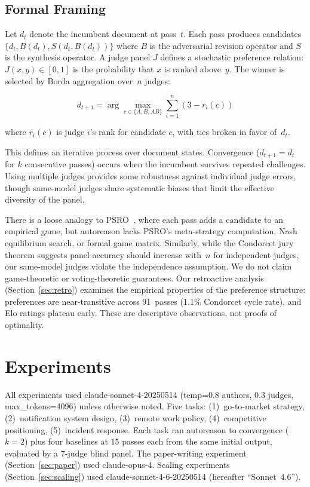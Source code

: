 \documentclass[11pt]{article}
\begin{document}
\subsection{Formal Framing}

Let $d_t$ denote the incumbent document at pass~$t$. Each pass produces candidates $\{d_t, B(d_t), S(d_t, B(d_t))\}$ where $B$ is the adversarial revision operator and $S$ is the synthesis operator. A judge panel $J$ defines a stochastic preference relation: $J(x, y) \in [0,1]$ is the probability that $x$ is ranked above~$y$. The winner is selected by Borda aggregation over~$n$ judges:

$$d_{t+1} = \arg\max_{c \in \{A, B, AB\}} \sum_{i=1}^{n} (3 - r_i(c))$$

where $r_i(c)$ is judge $i$'s rank for candidate $c$, with ties broken in favor of~$d_t$.

This defines an iterative process over document states. Convergence ($d_{t+1} = d_t$ for $k$ consecutive passes) occurs when the incumbent survives repeated challenges. Using multiple judges provides some robustness against individual judge errors, though same-model judges share systematic biases that limit the effective diversity of the panel.

There is a loose analogy to PSRO~\cite{psro}, where each pass adds a candidate to an empirical game, but autoreason lacks PSRO's meta-strategy computation, Nash equilibrium search, or formal game matrix. Similarly, while the Condorcet jury theorem suggests panel accuracy should increase with~$n$ for independent judges, our same-model judges violate the independence assumption. We do not claim game-theoretic or voting-theoretic guarantees. Our retroactive analysis (Section~\ref{sec:retro}) examines the empirical properties of the preference structure: preferences are near-transitive across 91~passes (1.1\% Condorcet cycle rate), and Elo ratings plateau early. These are descriptive observations, not proofs of optimality.

\section{Experiments}

All experiments used claude-sonnet-4-20250514 (temp=0.8 authors, 0.3 judges, max\_tokens=4096) unless otherwise noted. Five tasks: (1)~go-to-market strategy, (2)~notification system design, (3)~remote work policy, (4)~competitive positioning, (5)~incident response. Each task ran autoreason to convergence ($k{=}2$) plus four baselines at 15 passes each from the same initial output, evaluated by a 7-judge blind panel. The paper-writing experiment (Section~\ref{sec:paper}) used claude-opus-4. Scaling experiments (Section~\ref{sec:scaling}) used claude-sonnet-4-6-20250514 (hereafter ``Sonnet~4.6'').
\end{document}
